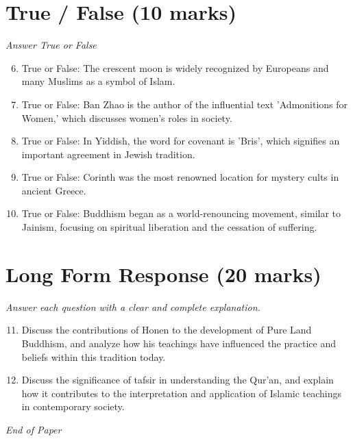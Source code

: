 \documentclass[12pt]{article}
\begin{document}
\section*{True / False (10 marks)}
\textit{Answer True or False}
\begin{enumerate}[label=\arabic*.]
\setcounter{enumi}{5}
\item True or False: The crescent moon is widely recognized by Europeans and many Muslims as a symbol of Islam.
\item True or False: Ban Zhao is the author of the influential text 'Admonitions for Women,' which discusses women's roles in society.
\item True or False: In Yiddish, the word for covenant is 'Bris', which signifies an important agreement in Jewish tradition.
\item True or False: Corinth was the most renowned location for mystery cults in ancient Greece.
\item True or False: Buddhism began as a world-renouncing movement, similar to Jainism, focusing on spiritual liberation and the cessation of suffering.
\end{enumerate}

\section*{Long Form Response (20 marks)}
\textit{Answer each question with a clear and complete explanation.}
\begin{enumerate}[label=\arabic*.]
\setcounter{enumi}{10}
\item Discuss the contributions of Honen to the development of Pure Land Buddhism, and analyze
how his teachings have influenced the practice and beliefs within this tradition today.
\item Discuss the significance of tafsir in understanding the Qur'an, and explain how it
contributes to the interpretation and application of Islamic teachings in contemporary
society.
\end{enumerate}

\vfill
\noindent\textit{End of Paper}
\end{document}
